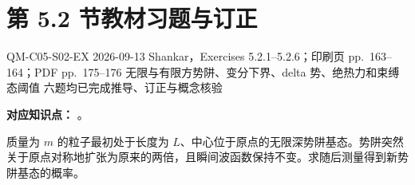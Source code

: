 \section{第 5.2 节教材习题与订正}
\label{exercise-set:QM-C05-S02}

\exercisemeta
  {QM-C05-S02-EX}
  {2026-09-13}
  {Shankar，Exercises 5.2.1--5.2.6；印刷页 pp.~163--164；PDF pp.~175--176}
  {无限与有限方势阱、变分下界、delta 势、绝热力和束缚态阈值}
  {六题均已完成推导、订正与概念核验}


\textbf{对应知识点：}
。

质量为 $m$ 的粒子最初处于长度为 $L$、中心位于原点的无限深势阱基态。势阱突然关于原点对称地扩张为原来的两倍，且瞬间波函数保持不变。求随后测量得到新势阱基态的概率。

